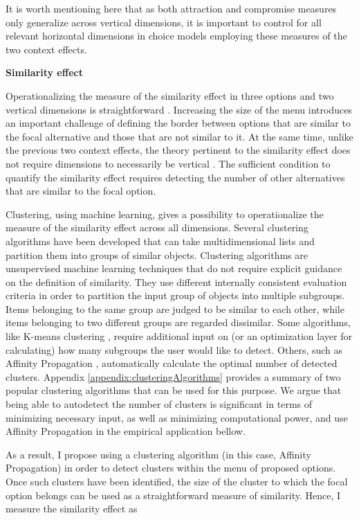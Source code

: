 \documentclass[a4paper,12pt]{article}
\begin{document}
 It is worth mentioning here that as both attraction and compromise measures only generalize across vertical dimensions, it is important to control for all relevant horizontal dimensions in choice models employing these measures of the two context effects.

 \textbf{Similarity effect}

 Operationalizing the measure of the similarity effect in three options and two vertical dimensions is straightforward \citep{roodrkerkEtAl11}. Increasing the size of the menu introduces an important challenge of defining the border between options that are similar to the focal alternative and those that are not similar to it. At the same time, unlike the previous two context effects, the theory pertinent to the similarity effect does not require dimensions to necessarily be vertical \citep{tversky1972elimination}. The sufficient condition to quantify the similarity effect requires detecting the number of other alternatives that are similar to the focal option.

 Clustering, using machine learning, gives a possibility to operationalize the measure of the similarity effect across all dimensions. Several clustering algorithms have been developed that can take multidimensional lists and partition them into groups of similar objects. Clustering algorithms are unsupervised machine learning techniques that do not require explicit guidance on the definition of similarity. They use different internally consistent evaluation criteria in order to partition the input group of objects into multiple subgroups. Items belonging to the same group are judged to be similar to each other, while items belonging to two different groups are regarded dissimilar. Some algorithms, like K-means clustering \citep{lloyd82}, require additional input on (or an optimization layer for calculating) how many subgroups the user would like to detect. Others, such as Affinity Propagation \citep{freyDueck07}, automatically calculate the optimal number of detected clusters. Appendix \ref{appendix:clusteringAlgorithms} provides a summary of two popular clustering algorithms that can be used for this purpose. We argue that being able to autodetect the number of clusters is significant in terms of minimizing necessary input, as well as minimizing computational power, and use Affinity Propagation in the empirical application bellow. 

 As a result, I propose using a clustering algorithm (in this case, Affinity Propagation) in order to detect clusters within the menu of proposed options. Once such clusters have been identified, the size of the cluster to which the focal option belongs can be used as a straightforward measure of similarity. Hence, I measure the similarity effect as
\end{document}
